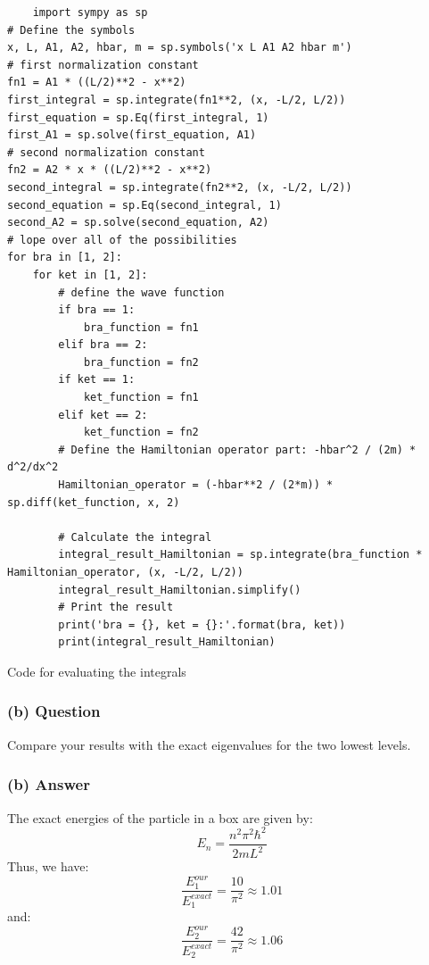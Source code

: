 \documentclass{article}
\begin{document}
\begin{algorithm}[H]
\SetAlgoLined
{}
\begin{verbatim}
    import sympy as sp
# Define the symbols
x, L, A1, A2, hbar, m = sp.symbols('x L A1 A2 hbar m')
# first normalization constant
fn1 = A1 * ((L/2)**2 - x**2)
first_integral = sp.integrate(fn1**2, (x, -L/2, L/2))
first_equation = sp.Eq(first_integral, 1)
first_A1 = sp.solve(first_equation, A1)
# second normalization constant
fn2 = A2 * x * ((L/2)**2 - x**2)
second_integral = sp.integrate(fn2**2, (x, -L/2, L/2))
second_equation = sp.Eq(second_integral, 1)
second_A2 = sp.solve(second_equation, A2)
# lope over all of the possibilities
for bra in [1, 2]:
    for ket in [1, 2]:
        # define the wave function
        if bra == 1:
            bra_function = fn1
        elif bra == 2:
            bra_function = fn2
        if ket == 1:
            ket_function = fn1
        elif ket == 2:
            ket_function = fn2
        # Define the Hamiltonian operator part: -hbar^2 / (2m) * d^2/dx^2
        Hamiltonian_operator = (-hbar**2 / (2*m)) * sp.diff(ket_function, x, 2)

        # Calculate the integral
        integral_result_Hamiltonian = sp.integrate(bra_function * Hamiltonian_operator, (x, -L/2, L/2))
        integral_result_Hamiltonian.simplify()
        # Print the result
        print('bra = {}, ket = {}:'.format(bra, ket))
        print(integral_result_Hamiltonian)
\end{verbatim}
\caption{Code for evaluating the integrals}
\end{algorithm}

\subsubsection*{(b) Question}
Compare your results with the exact eigenvalues for the two lowest levels.

\subsubsection*{(b) Answer}
The exact energies of the particle in a box are given by:
\begin{equation}
    E_n = \frac{n^2\pi^2\hbar^2}{2mL^2}
\end{equation}
Thus, we have:
\begin{equation}
    \frac{E_1^{our}}{E_1^{exact}} = \frac{10}{\pi^2} \approx 1.01
\end{equation}
and:
\begin{equation}
    \frac{E_2^{our}}{E_2^{exact}} = \frac{42}{\pi^2} \approx 1.06
\end{equation}
\end{document}

